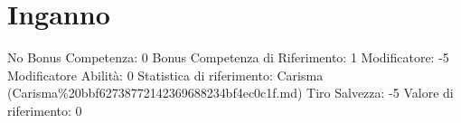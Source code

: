 \section{Inganno}\label{inganno}

\begin{description}
\tightlist
\item[Tags: ABI]
No Bonus Competenza: 0 Bonus Competenza di Riferimento: 1 Modificatore:
-5 Modificatore Abilità: 0 Statistica di riferimento: Carisma
(Carisma\%20bbf62738772142369688234bf4ec0c1f.md) Tiro Salvezza: -5
Valore di riferimento: 0
\end{description}
